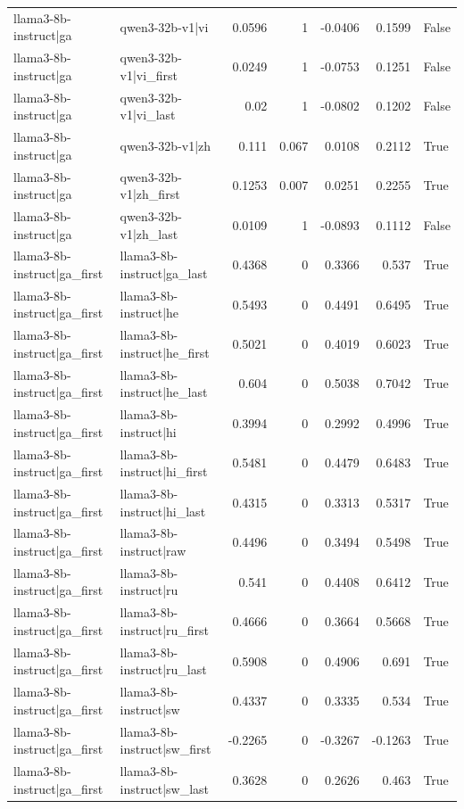 \begin{table}
\begin{tabular}{l l r r r r l}
llama3-8b-instruct|ga & qwen3-32b-v1|vi & 0.0596 & 1 & -0.0406 & 0.1599 & False \\
llama3-8b-instruct|ga & qwen3-32b-v1|vi_first & 0.0249 & 1 & -0.0753 & 0.1251 & False \\
llama3-8b-instruct|ga & qwen3-32b-v1|vi_last & 0.02 & 1 & -0.0802 & 0.1202 & False \\
llama3-8b-instruct|ga & qwen3-32b-v1|zh & 0.111 & 0.067 & 0.0108 & 0.2112 & True \\
llama3-8b-instruct|ga & qwen3-32b-v1|zh_first & 0.1253 & 0.007 & 0.0251 & 0.2255 & True \\
llama3-8b-instruct|ga & qwen3-32b-v1|zh_last & 0.0109 & 1 & -0.0893 & 0.1112 & False \\
llama3-8b-instruct|ga_first & llama3-8b-instruct|ga_last & 0.4368 & 0 & 0.3366 & 0.537 & True \\
llama3-8b-instruct|ga_first & llama3-8b-instruct|he & 0.5493 & 0 & 0.4491 & 0.6495 & True \\
llama3-8b-instruct|ga_first & llama3-8b-instruct|he_first & 0.5021 & 0 & 0.4019 & 0.6023 & True \\
llama3-8b-instruct|ga_first & llama3-8b-instruct|he_last & 0.604 & 0 & 0.5038 & 0.7042 & True \\
llama3-8b-instruct|ga_first & llama3-8b-instruct|hi & 0.3994 & 0 & 0.2992 & 0.4996 & True \\
llama3-8b-instruct|ga_first & llama3-8b-instruct|hi_first & 0.5481 & 0 & 0.4479 & 0.6483 & True \\
llama3-8b-instruct|ga_first & llama3-8b-instruct|hi_last & 0.4315 & 0 & 0.3313 & 0.5317 & True \\
llama3-8b-instruct|ga_first & llama3-8b-instruct|raw & 0.4496 & 0 & 0.3494 & 0.5498 & True \\
llama3-8b-instruct|ga_first & llama3-8b-instruct|ru & 0.541 & 0 & 0.4408 & 0.6412 & True \\
llama3-8b-instruct|ga_first & llama3-8b-instruct|ru_first & 0.4666 & 0 & 0.3664 & 0.5668 & True \\
llama3-8b-instruct|ga_first & llama3-8b-instruct|ru_last & 0.5908 & 0 & 0.4906 & 0.691 & True \\
llama3-8b-instruct|ga_first & llama3-8b-instruct|sw & 0.4337 & 0 & 0.3335 & 0.534 & True \\
llama3-8b-instruct|ga_first & llama3-8b-instruct|sw_first & -0.2265 & 0 & -0.3267 & -0.1263 & True \\
llama3-8b-instruct|ga_first & llama3-8b-instruct|sw_last & 0.3628 & 0 & 0.2626 & 0.463 & True \\

\end{tabular}
\end{table}
